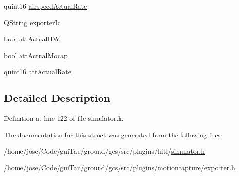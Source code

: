 \begin{DoxyCompactItemize}
\item 
quint16 \hyperlink{group___h_i_t_l_plugin_gacb3c852192e75845b2a17679c94a10c1}{airspeed\-Actual\-Rate}
\item 
\hyperlink{group___u_a_v_objects_plugin_gab9d252f49c333c94a72f97ce3105a32d}{Q\-String} \hyperlink{group___mo_cap_plugin_ga2bff4ba6b082ec966a7075df9e19d66b}{exporter\-Id}
\item 
bool \hyperlink{group___mo_cap_plugin_ga4d9a7f3563731377f2905f1b18e17d52}{att\-Actual\-H\-W}
\item 
bool \hyperlink{group___mo_cap_plugin_gacd70b3a85672be0f8311fc107768c93f}{att\-Actual\-Mocap}
\item 
quint16 \hyperlink{group___mo_cap_plugin_ga14fb71ed2eb43b817ee157f6cdcb84eb}{att\-Actual\-Rate}
\end{DoxyCompactItemize}


\subsection{Detailed Description}


Definition at line 122 of file simulator.\-h.



The documentation for this struct was generated from the following files\-:\begin{DoxyCompactItemize}
\item 
/home/jose/\-Code/gui\-Tau/ground/gcs/src/plugins/hitl/\hyperlink{simulator_8h}{simulator.\-h}\item 
/home/jose/\-Code/gui\-Tau/ground/gcs/src/plugins/motioncapture/\hyperlink{exporter_8h}{exporter.\-h}\end{DoxyCompactItemize}
